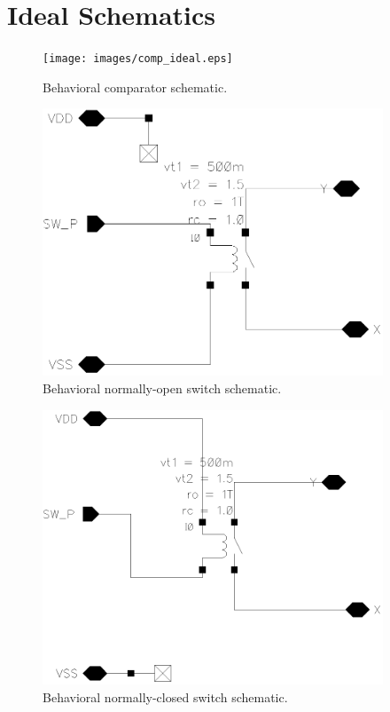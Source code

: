 \documentclass[11pt,letterpaper]{article}
\begin{document}
\renewcommand{\thesection}{A}
\section{Ideal Schematics}\label{app1}

\begin{figure}[htbp!]
    \centering
    \texttt{[image: images/comp\_ideal.eps]}
    \caption{Behavioral comparator schematic.}\label{fig:comp_ideal}
\end{figure}

\begin{figure}[htbp!]
    \centering
    \includegraphics[width=4in]{images/no_ideal.eps}
    \caption{Behavioral normally-open switch schematic.}\label{fig:sw_no_ideal}
\end{figure}

\begin{figure}[htbp!]
    \centering
    \includegraphics[width=4in]{images/nc_ideal.eps}
    \caption{Behavioral normally-closed switch schematic.}\label{fig:sw_nc_ideal}
\end{figure}
\end{document}
